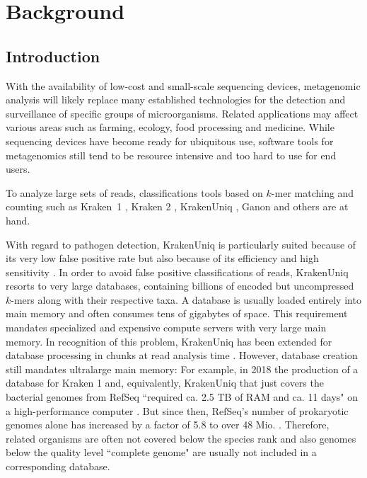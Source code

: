 \documentclass[pdflatex,sn-vancouver-num]{sn-jnl}
\begin{document}
    \maketitle

    \section{Background}\label{background}

    \subsection{Introduction}
\label{problem}

    With the availability of low-cost and small-scale sequencing devices, metagenomic analysis will likely replace many established technologies for the detection and surveillance of specific groups of microorganisms. Related applications may affect various areas such as farming, ecology, food processing and medicine. While sequencing devices have become ready for ubiquitous use, software tools for metagenomics still tend to be resource intensive and too hard to use for end users.

    To analyze large sets of reads, classifications tools based on $k$-mer matching and counting such as Kraken~1 \citep{kraken}, Kraken 2 \citep{kraken2}, KrakenUniq \citep{krakenUniq}, Ganon \citep{Piro:2020aa, 10.1093/nargab/lqaf094} and others are at hand. 
    
    With regard to pathogen detection, KrakenUniq is particularly suited because of its very low false positive rate but also because of its efficiency and high sensitivity \citep{krakenUniq}.
In order to avoid false positive classifications of reads, KrakenUniq resorts to very large databases, containing billions of encoded but uncompressed $k$-mers along with their respective taxa. A database is usually loaded entirely into main memory and often consumes tens of gigabytes of space. This requirement mandates specialized and expensive compute servers with very large main memory.
In recognition of this problem, KrakenUniq has been extended for database processing in chunks at read analysis time \citep{lowmemkraken}. However, database creation still mandates ultralarge main memory: For example, in 2018 the production of a database for Kraken 1 and, equivalently, KrakenUniq that just covers the bacterial genomes from RefSeq \citep{refseq} ``required ca. 2.5 TB of RAM and ca. 11 days" on a high-performance computer \citep{Nasko:2018aa}. But since then, RefSeq's number of prokaryotic genomes alone has increased by a factor of 5.8 to over 48 Mio. \citep{10.1093/nar/gkae1038}.
    Therefore, related organisms are often not covered below the species rank and also genomes below the quality level ``complete genome" are usually not included in a corresponding database.
\end{document}
